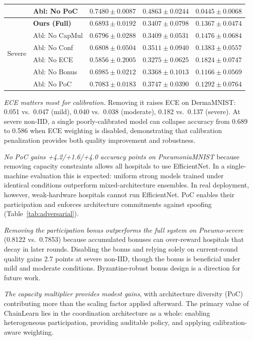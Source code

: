 \documentclass[conference]{IEEEtran}
\begin{document}
\begin{table}[H]
{\begin{tabular}{llccc}
 & Abl: No PoC           & $0.7480 \pm 0.0087$ & $0.4863 \pm 0.0244$ & $0.0445 \pm 0.0068$ \\
\midrule
\multirow{6}{*}{Severe}
 & \textbf{Ours (Full)}  & $0.6893 \pm 0.0192$ & $0.3407 \pm 0.0798$ & $0.1367 \pm 0.0474$ \\
 & Abl: No CapMul        & $0.6796 \pm 0.0288$ & $0.3409 \pm 0.0531$ & $0.1476 \pm 0.0684$ \\
 & Abl: No Conf          & $0.6808 \pm 0.0504$ & $0.3511 \pm 0.0940$ & $0.1383 \pm 0.0557$ \\
 & Abl: No ECE           & $0.5856 \pm 0.2005$ & $0.3275 \pm 0.0625$ & $0.1824 \pm 0.0747$ \\
 & Abl: No Bonus         & $0.6985 \pm 0.0212$ & $0.3368 \pm 0.1013$ & $0.1166 \pm 0.0569$ \\
 & Abl: No PoC           & $0.7083 \pm 0.0183$ & $0.3747 \pm 0.0390$ & $0.1292 \pm 0.0764$ \\
\bottomrule
\end{tabular}}
\end{table}

\textit{ECE matters most for calibration.} Removing it raises ECE on DermaMNIST: 0.051 vs.\ 0.047 (mild), 0.040 vs.\ 0.038 (moderate), 0.182 vs.\ 0.137 (severe). At severe non-IID, a single poorly-calibrated model can collapse accuracy from 0.689 to 0.586 when ECE weighting is disabled, demonstrating that calibration penalization provides both quality improvement and robustness.

\textit{No PoC gains +4.2/+1.6/+4.0 accuracy points on PneumoniaMNIST} because removing capacity constraints allows all hospitals to use EfficientNet. In a single-machine evaluation this is expected: uniform strong models trained under identical conditions outperform mixed-architecture ensembles. In real deployment, however, weak-hardware hospitals cannot run EfficientNet. PoC enables their participation and enforces architecture commitments against spoofing (Table~\ref{tab:adversarial}).

\textit{Removing the participation bonus outperforms the full system on Pneumo-severe} (0.8122 vs.\ 0.7853) because accumulated bonuses can over-reward hospitals that decay in later rounds. Disabling the bonus and relying solely on current-round quality gains 2.7 points at severe non-IID, though the bonus is beneficial under mild and moderate conditions. Byzantine-robust bonus design is a direction for future work.

\textit{The capacity multiplier provides modest gains}, with architecture diversity (PoC) contributing more than the scaling factor applied afterward. The primary value of ChainLearn lies in the coordination architecture as a whole: enabling heterogeneous participation, providing auditable policy, and applying calibration-aware weighting.
\end{document}
